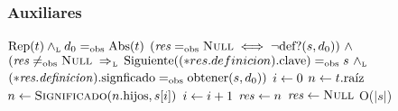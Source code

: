
\subsubsection*{Auxiliares}

{$\text{\normalfont Rep}(t) \land_{\mathrm{\scriptscriptstyle{L}}} d_0 =_{\mathrm{obs}} \text{\normalfont Abs}(t)$}{
    $(\text{\textit{res}} =_{\mathrm{obs}} \textsc{Null} \iff \lnot\text{\normalfont def?}(s, d_0))\ \land$ \\
      $(\var{res} \nigobs \NULL \impluego \fun{Siguiente}((*res.definicion).\fun{clave}) \igobs s\ \yluego$ \\
          $(*\text{\textit{res.definicion}}).\text{\normalfont signficado} =_{\mathrm{obs}} \text{\normalfont obtener}(s, d_0))$}
          {
                \State $i \leftarrow 0$
                      \State $n \leftarrow t.\text{\normalfont raíz}$
                             
                                \State $n \leftarrow \text{\normalfont\textsc{Significado}}(n.\text{\normalfont hijos}, s[i])$
                                          \State $i \leftarrow i + 1$
                                                  \EndWhile
                                                     
                                                        \State $\text{\textit{res}} \leftarrow n$
                                                                \Else
                                                                    \State $\text{\textit{res}} \leftarrow \textsc{Null}$
                                                                            \EndIf
          }{O($|s|$)}


